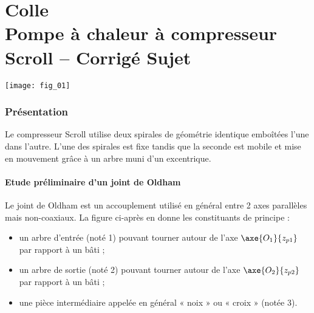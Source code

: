 \chapter*{Colle  \\ 
Pompe à chaleur à compresseur Scroll -- 
\ifprof Corrigé \else Sujet \fi}

\iflivret {} \else
\ifprof  {} \else \fi
\fi

\setcounter{question}{0}

\begin{marginfigure}[4cm]
\centering
\texttt{[image: fig\_01]}
\end{marginfigure}


\subsection*{Présentation}
Le compresseur Scroll utilise deux spirales de géométrie identique emboîtées l’une dans 
l’autre. L’une des spirales est fixe tandis que la seconde est mobile et mise 
en mouvement grâce à un arbre muni d’un excentrique. 



\subsubsection*{Etude préliminaire d'un joint de Oldham}


Le joint de Oldham est un accouplement utilisé en général entre 2 axes parallèles mais non-coaxiaux. La figure ci-après en donne les constituants de principe :
\begin{itemize}
\item un arbre d’entrée (noté 1) pouvant tourner autour de l’axe $\axe{O_1}{z_{p1}}$ par rapport à un bâti ;
\item un arbre de sortie (noté 2) pouvant tourner autour de l’axe $\axe{O_2}{z_{p2}}$ par rapport à un bâti ;
\item une pièce intermédiaire appelée en général « noix » ou « croix » (notée 3).
\end{itemize}

